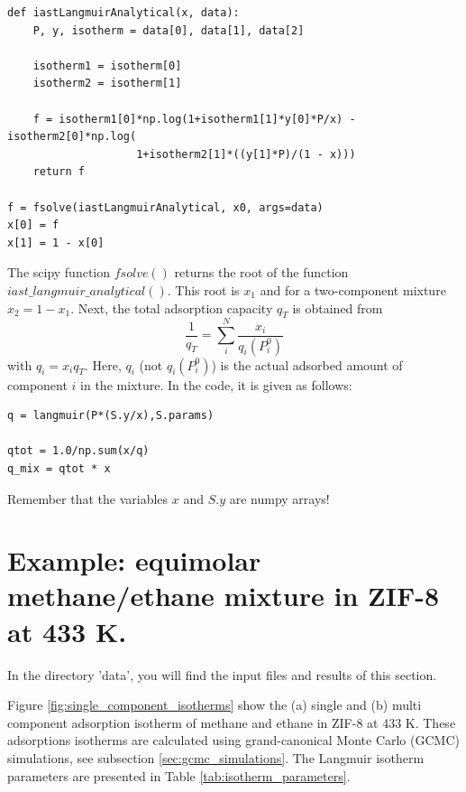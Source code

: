 \documentclass{article}
\begin{document}
\begin{lstlisting}[caption={Find root of equation (\ref{eq:find_root}) and obtain $x_1$.}]
def iastLangmuirAnalytical(x, data):
    P, y, isotherm = data[0], data[1], data[2]

    isotherm1 = isotherm[0]
    isotherm2 = isotherm[1]

    f = isotherm1[0]*np.log(1+isotherm1[1]*y[0]*P/x) - isotherm2[0]*np.log(
                    1+isotherm2[1]*((y[1]*P)/(1 - x)))
    return f
   
f = fsolve(iastLangmuirAnalytical, x0, args=data)
x[0] = f
x[1] = 1 - x[0]
\end{lstlisting}

The scipy function $fsolve()$ returns the root of the function $iast\_langmuir\_analytical()$. This root is $x_1$ and for a two-component mixture $x_2 = 1 - x_1$. Next, the total adsorption capacity $q_T$ is obtained from
%
\begin{equation}
        \frac{1}{q_T} = \sum_{i}^N\frac{x_i}{q_i(P_i^0)}
	\label{eq:total_adsorbed_loading}
\end{equation}
%
with $q_i={x_i}q_T$. Here, $q_i$ (not $q_i(P_i^0)$) is the actual adsorbed amount of component $i$ in the mixture. In the code, it is given as follows: 
%
\begin{lstlisting}[caption={Compute the mixture adsorption isotherms based on equation (\ref{eq:total_adsorbed_loading}).}]
q = langmuir(P*(S.y/x),S.params)

qtot = 1.0/np.sum(x/q)
q_mix = qtot * x
\end{lstlisting}
%
Remember that the variables $x$ and $S.y$ are numpy arrays!

\section{Example: equimolar methane/ethane mixture in ZIF-8 at 433 K.}
In the directory 'data', you will find the input files and results of this section.

Figure \ref{fig:single_component_isotherms} show the (a) single and (b) multi component adsorption isotherm of methane and ethane in ZIF-8 at 433 K. These adsorptions isotherms are calculated using grand-canonical Monte Carlo (GCMC) simulations\cite{Dubbeldam2013}, see subsection \ref{sec:gcmc_simulations}. The Langmuir isotherm parameters are presented in Table \ref{tab:isotherm_parameters}.

\clearpage
\end{document}
